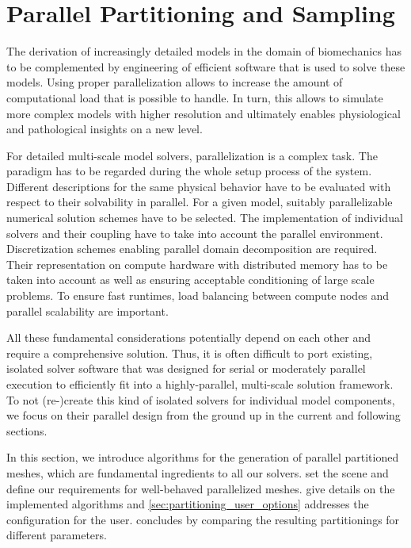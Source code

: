 \section{Parallel Partitioning and Sampling}\label{sec:parallel_partitioning_and_sampling_of_the}


The derivation of increasingly detailed models in the domain of biomechanics has to be complemented by engineering of efficient software that is used to solve these models. Using proper parallelization allows to increase the amount of computational load that is possible to handle. In turn, this allows to simulate more complex models with higher resolution and ultimately enables physiological and pathological insights on a new level.

For detailed multi-scale model solvers, parallelization is a complex task. 
The paradigm has to be regarded  during the whole setup process of the system. Different descriptions for the same physical behavior have to be evaluated with respect to their solvability in parallel. For a given model, suitably parallelizable numerical solution schemes have to be selected. The implementation of individual solvers and their coupling have to take into account the parallel environment. 
Discretization schemes enabling parallel domain decomposition are required. Their representation on compute hardware with distributed memory has to be taken into account as well as ensuring acceptable conditioning of large scale problems. To ensure fast runtimes, load balancing between compute nodes and parallel scalability are important.

All these fundamental considerations potentially depend on each other and require a comprehensive solution. 
Thus, it is often difficult to port existing, isolated solver software that was designed for serial or moderately parallel execution to efficiently fit into a highly-parallel, multi-scale solution framework. To not (re-)create this kind of isolated solvers for individual model components, we focus on their parallel design from the ground up in the current and following sections.

In this section, we introduce algorithms for the generation of parallel partitioned meshes, which are fundamental ingredients to all our solvers.  set the scene and define our requirements for well-behaved parallelized meshes.  give details on the implemented algorithms and \cref{sec:partitioning_user_options} addresses the configuration for the user.  concludes by comparing the resulting partitionings for different parameters.

